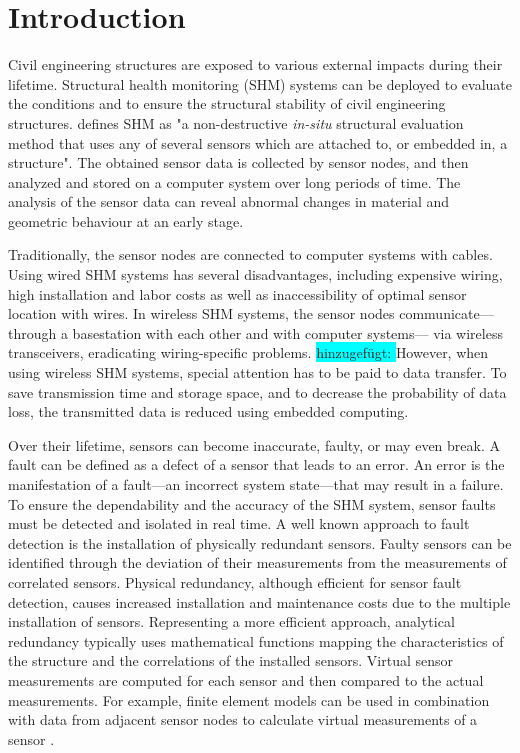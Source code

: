\documentclass[12pt,a4paper]{scrartcl}
\begin{document}

\section*{Introduction}

Civil engineering structures are exposed to various external impacts during their lifetime. 
Structural health monitoring (SHM) systems can be deployed to evaluate the conditions and to ensure the structural stability of civil engineering structures.
\citet{BisbySHM} defines SHM as "a non-destructive \textit{in-situ} structural evaluation method that uses any of several sensors which are attached to, or embedded in, a structure".
The obtained sensor data is collected by sensor nodes, and then analyzed and stored on a computer system over long periods of time. 
The analysis of the sensor data can reveal abnormal changes in material and geometric behaviour at an early stage.

Traditionally, the sensor nodes are connected to computer systems with cables.
Using wired SHM systems has several disadvantages, including expensive wiring, high installation and labor costs as well as inaccessibility of optimal sensor location with wires.
In wireless SHM systems, the sensor nodes communicate---through a basestation with each other and with computer systems--- via wireless transceivers, eradicating wiring-specific problems. \colorbox{cyan}{hinzugefügt: }However, when using wireless SHM systems, special attention has to be paid to data transfer. 
To save transmission time and storage space, and to decrease the probability of data loss, the transmitted data is reduced using embedded computing. 

Over their lifetime, sensors can become inaccurate, faulty, or may even break.
A fault can be defined as a defect of a sensor that leads to an error. An error is the manifestation of a fault---an incorrect system state---that may result in a failure.
To ensure the dependability and the accuracy of the SHM system, sensor faults must be detected and isolated in real time. 
A well known approach to fault detection is the installation of physically redundant sensors.
Faulty sensors can be identified through the deviation of their measurements from the measurements of correlated sensors.
Physical redundancy, although efficient for sensor fault detection, causes increased installation and maintenance costs due to the multiple installation of sensors. 
Representing a more efficient approach, analytical redundancy typically uses mathematical functions mapping the characteristics of the structure and the correlations of the installed sensors. Virtual sensor measurements are computed for each sensor and then compared to the actual measurements. 
For example, finite element models can be used in combination with data from adjacent sensor nodes to calculate virtual measurements of a sensor
\citep{Smarsly2014}.
\end{document}
